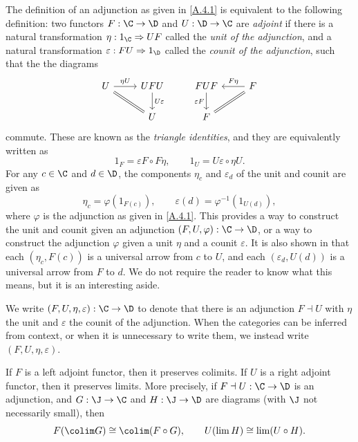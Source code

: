 \begin{proposition}\label{A.4.3}
    The definition of an adjunction as given in \cref{A.4.1} is equivalent to the following definition: two functors $F : \C\to\D$ and $U:\D\to\C$ are \emph{adjoint} if there is a natural transformation $\eta : 1_\C\Rightarrow UF$ called the \emph{unit of the adjunction}, and a natural transformation $\varepsilon : FU\Rightarrow 1_\D$ called the \emph{counit of the adjunction}, such that the the diagrams
    \[\begin{tikzcd}
	U & UFU & FUF & F \\
	& U & F
	\arrow["{\eta U}", from=1-1, to=1-2]
	\arrow[equals, from=1-1, to=2-2]
	\arrow["{U\varepsilon }", from=1-2, to=2-2]
	\arrow["{\varepsilon F}"', from=1-3, to=2-3]
	\arrow["{F\eta }"', from=1-4, to=1-3]
	\arrow[equals, from=1-4, to=2-3]
    \end{tikzcd}\]
    commute. These are known as the \emph{triangle identities}, and they are equivalently written as
    \[
    1_F = \varepsilon F\circ F\eta,\qquad 1_U = U\varepsilon\circ\eta U.
    \]
    For any $c\in\C$ and $d\in\D$, the components $\eta_c$ and $\varepsilon_d$ of the unit and counit are given as
    \[
    \eta_c = \varphi(1_{F(c)}),\qquad \varepsilon(d)=\varphi^{-1}(1_{U(d)}),
    \]
    where $\varphi$ is the adjunction as given in \cref{A.4.1}. This provides a way to construct the unit and counit given an adjunction $(F,U,\varphi):\C\to\D$, or a way to construct the adjunction $\varphi$ given a unit $\eta$ and a counit $\varepsilon$. It is also shown in \cite{ml} that each $(\eta_c,F(c))$ is a universal arrow from $c$ to $U$, and each $(\varepsilon_d,U(d))$ is a universal arrow from $F$ to $d$. We do not require the reader to know what this means, but it is an interesting aside.
\end{proposition}

\begin{notation}\label{A.4.4}
    We write $(F,U,\eta,\varepsilon) : \C\to\D$ to denote that there is an adjunction $F\dashv U$ with $\eta$ the unit and $\varepsilon$ the counit of the adjunction. When the categories can be inferred from context, or when it is unnecessary to write them, we instead write $(F,U,\eta,\varepsilon)$.
\end{notation}

\begin{proposition}\label{A.4.5}
    If $F$ is a left adjoint functor, then it preserves colimits. If $U$ is a right adjoint functor, then it preserves limits. More precisely, if $F\dashv U : \C\to\D$ is an adjunction, and $G:\J\to\C$ and $H:\J\to\D$ are diagrams (with $\J$ not necessarily small), then
    \[
    F(\colim G)\cong \colim (F\circ G),\qquad U(\lim H)\cong \lim(U\circ H).
    \]
\end{proposition}

